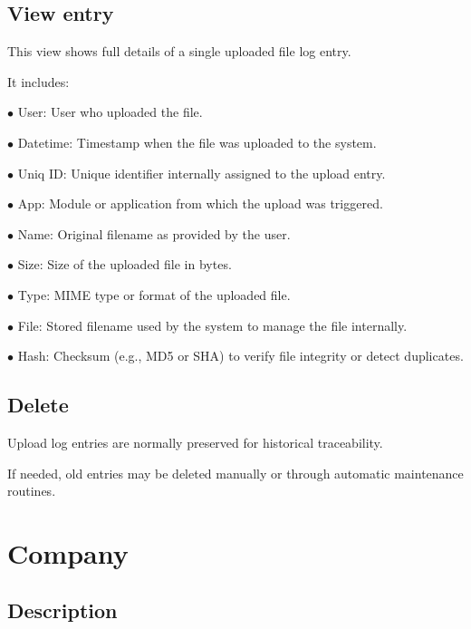 \documentclass[a4paper]{article}
\begin{document}
\hypertarget{toc39}{}
\subsection{View entry}

This view shows full details of a single uploaded file log entry.

It includes:

\begin{compactitem}
\item[\color{myblue}$\bullet$] User: User who uploaded the file.
\item[\color{myblue}$\bullet$] Datetime: Timestamp when the file was uploaded to the system.
\item[\color{myblue}$\bullet$] Uniq ID: Unique identifier internally assigned to the upload entry.
\item[\color{myblue}$\bullet$] App: Module or application from which the upload was triggered.
\item[\color{myblue}$\bullet$] Name: Original filename as provided by the user.
\item[\color{myblue}$\bullet$] Size: Size of the uploaded file in bytes.
\item[\color{myblue}$\bullet$] Type: MIME type or format of the uploaded file.
\item[\color{myblue}$\bullet$] File: Stored filename used by the system to manage the file internally.
\item[\color{myblue}$\bullet$] Hash: Checksum (e.g., MD5 or SHA) to verify file integrity or detect duplicates.
\end{compactitem}

\hypertarget{toc40}{}
\subsection{Delete}

Upload log entries are normally preserved for historical traceability.

If needed, old entries may be deleted manually or through automatic maintenance routines.


\hypertarget{toc41}{}
\section{Company}

\hypertarget{toc42}{}
\subsection{Description}
\end{document}
